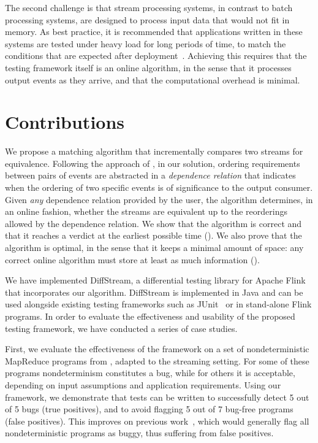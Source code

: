 The second challenge is that
stream processing systems, in contrast to batch processing systems,
are designed to process input data that would not fit
in memory.  As best practice, it is recommended that applications written in these systems are
tested under heavy load for long periods of time, to match the
conditions that are expected after
deployment~\cite{vianna2019exploratory}. Achieving this requires that
the testing framework itself is an online algorithm, in the sense that
it processes output events as they arrive, and that the computational overhead is minimal.

\section{Contributions}

We propose a matching algorithm that incrementally compares two streams for equivalence.
Following the approach of , in our solution, ordering requirements between pairs of events are abstracted in a \emph{dependence relation} that indicates when the ordering of two specific events is of significance to the output consumer.
Given \emph{any} dependence relation provided by the user, the algorithm determines, in an online fashion, whether the streams are equivalent up to the reorderings allowed by the dependence relation.
We show that the algorithm is correct and that it reaches a verdict at the earliest possible time ().
We also prove that the algorithm is optimal, in the sense that it keeps a minimal amount of space: any correct online algorithm must store at least as much information ().

We have implemented DiffStream{}, a differential testing library for Apache Flink that incorporates our algorithm.
DiffStream{} is implemented in Java and can be used alongside existing
testing frameworks such as
JUnit~\cite{JUnitWeb} or in stand-alone Flink programs.
In order to evaluate the effectiveness and usability of the proposed testing framework, we have conducted a series of case studies.

First, we evaluate the effectiveness of the framework on a
set of nondeterministic MapReduce programs from \cite{xiao2014nondeterminism}, adapted to the streaming setting.
For some of these programs nondeterminism constitutes a bug, while for others it is acceptable, depending on input assumptions and application requirements.
Using our framework, we demonstrate that tests can be written to successfully detect 5 out of 5 bugs (true positives), and to avoid flagging 5 out of 7 bug-free programs (false positives).
This improves on previous work~\cite{xu2013testing}, which would generally flag all nondeterministic programs as buggy, thus suffering from false positives.

